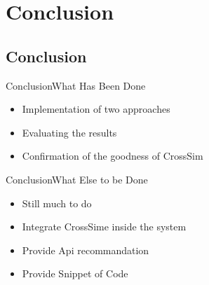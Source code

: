 \documentclass{beamer}
\begin{document}
\section{Conclusion}
\subsection{Conclusion}

\begin{frame}{Conclusion}{What Has Been Done}
	\begin{itemize}
		\item Implementation of two approaches
		\item Evaluating the results
		\item Confirmation of the goodness of CrossSim
	\end{itemize}
\end{frame}

\begin{frame}{Conclusion}{What Else to be Done}
	\begin{itemize}
		\item Still much to do
		\item Integrate CrossSime inside the system
		\item Provide Api recommandation
		\item Provide Snippet of Code
	\end{itemize}
\end{frame}
\end{document}
